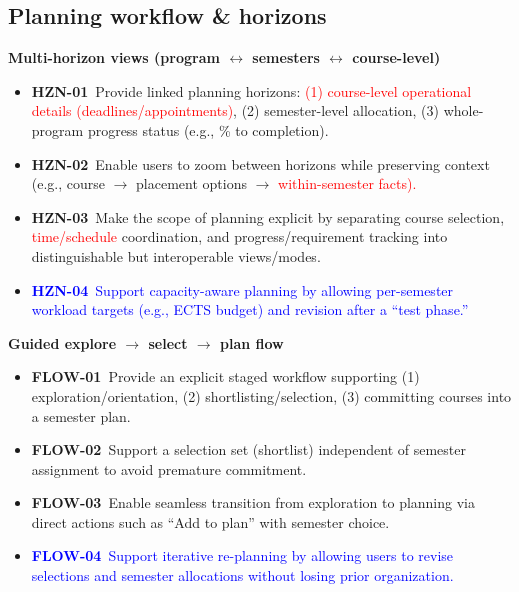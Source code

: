 \subsection*{Planning workflow \& horizons}

\textbf{Multi-horizon views (program $\leftrightarrow$ semesters $\leftrightarrow$ course-level)}
\begin{itemize}
  \item \textbf{HZN-01}~Provide linked planning horizons: \textcolor{red}{(1) course-level operational details (deadlines/appointments)}, (2) semester-level allocation, (3) whole-program progress status (e.g., \% to completion).
  \item \textbf{HZN-02}~Enable users to zoom between horizons while preserving context (e.g., course $\rightarrow$ placement options $\rightarrow$ \textcolor{red}{within-semester facts).}
  \item \textbf{HZN-03}~Make the scope of planning explicit by separating course selection, \textcolor{red}{time/schedule} coordination, and progress/requirement tracking into distinguishable but interoperable views/modes.
  \item \textcolor{blue}{\textbf{HZN-04}~Support capacity-aware planning by allowing per-semester workload targets (e.g., ECTS budget) and revision after a “test phase.”}
\end{itemize}

\textbf{Guided explore $\rightarrow$ select $\rightarrow$ plan flow}
\begin{itemize}
  \item \textbf{FLOW-01}~Provide an explicit staged workflow supporting (1) exploration/orientation, (2) shortlisting/selection, (3) committing courses into a semester plan.
  \item \textbf{FLOW-02}~Support a selection set (shortlist) independent of semester assignment to avoid premature commitment.
  \item \textbf{FLOW-03}~Enable seamless transition from exploration to planning via direct actions such as “Add to plan” with semester choice.
  \item \textcolor{blue}{\textbf{FLOW-04}~Support iterative re-planning by allowing users to revise selections and semester allocations without losing prior organization.}
\end{itemize}


